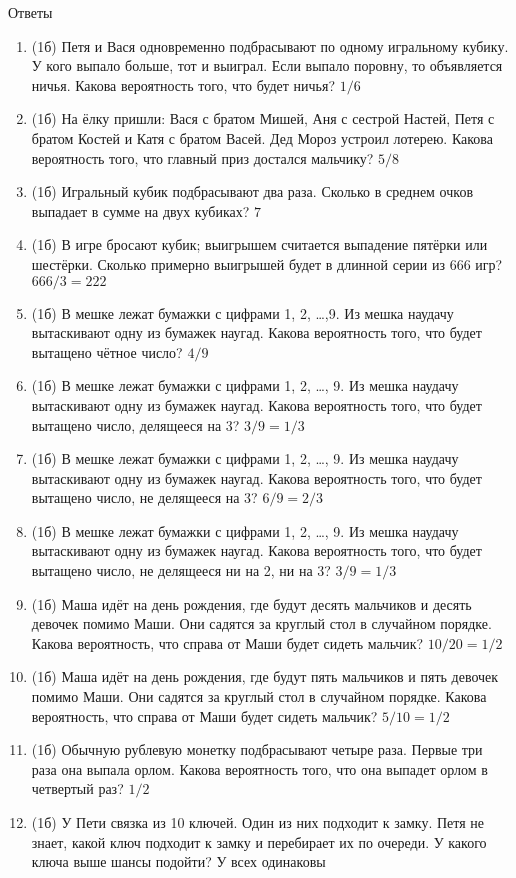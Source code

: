 \documentclass[a4paper, 12pt]{article}
\begin{document}
\newpage
Ответы
\begin{enumerate}
\item (1б) Петя и Вася одновременно подбрасывают по одному игральному кубику. У кого выпало больше, тот и выиграл. Если выпало поровну, то объявляется ничья. Какова вероятность того, что будет ничья? $1/6$
\item (1б) На ёлку пришли: Вася с братом Мишей, Аня с сестрой Настей, Петя с братом Костей и Катя с братом Васей. Дед Мороз устроил лотерею. Какова вероятность того, что главный приз достался мальчику? $5/8$
\item (1б) Игральный кубик подбрасывают два раза. Сколько в среднем очков выпадает в сумме на двух кубиках? $7$
\item (1б) В игре бросают кубик; выигрышем считается выпадение пятёрки или шестёрки. Сколько примерно выигрышей будет в длинной серии из 666 игр? $666/3=222$
\item (1б) В мешке лежат бумажки с цифрами 1, 2, \ldots ,9. Из мешка наудачу вытаскивают одну из бумажек наугад. Какова вероятность того, что будет вытащено чётное число? $4/9$
\item (1б) В мешке лежат бумажки с цифрами 1, 2, \ldots, 9. Из мешка наудачу вытаскивают одну из бумажек наугад. Какова вероятность того, что будет вытащено число, делящееся на 3? $3/9=1/3$
\item (1б) В мешке лежат бумажки с цифрами 1, 2, \ldots, 9. Из мешка наудачу вытаскивают одну из бумажек наугад. Какова вероятность того, что будет вытащено число, не делящееся на 3? $6/9=2/3$
\item (1б) В мешке лежат бумажки с цифрами 1, 2, \ldots, 9. Из мешка наудачу вытаскивают одну из бумажек наугад. Какова вероятность того, что будет вытащено число, не делящееся ни на 2, ни на 3? $3/9=1/3$
\item (1б) Маша идёт на день рождения, где будут десять мальчиков и десять девочек помимо Маши. Они садятся за круглый стол в случайном порядке. Какова вероятность, что справа от Маши будет сидеть мальчик? $10/20=1/2$
\item (1б) Маша идёт на день рождения, где будут пять мальчиков и пять девочек помимо Маши. Они садятся за круглый стол в случайном порядке. Какова вероятность, что справа от Маши будет сидеть мальчик? $5/10=1/2$
\item (1б) Обычную рублевую монетку подбрасывают четыре раза. Первые три раза она выпала орлом. Какова вероятность того, что она выпадет орлом в четвертый раз? $1/2$
\item (1б) У Пети связка из 10 ключей. Один из них подходит к замку. Петя не знает, какой ключ подходит к замку и перебирает их по очереди. У какого ключа выше шансы подойти? У всех одинаковы

\end{enumerate}
\end{document}
